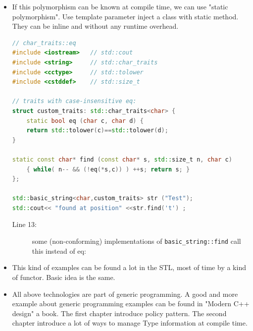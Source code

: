 \documentclass[a4paper,11pt,twoside]{book}
\begin{document}
\begin{itemize}
		\item If this polymorphism can be known at compile time, we can use "static polymorphism". Use template parameter inject a class with static method. They can be inline and without any runtime overhead. 
\begin{lstlisting}[frame=single, language=c++]
// char_traits::eq
#include <iostream>   // std::cout
#include <string>     // std::char_traits
#include <cctype>     // std::tolower
#include <cstddef>    // std::size_t
	
// traits with case-insensitive eq:
struct custom_traits: std::char_traits<char> {
	static bool eq (char c, char d) { 
	return std::tolower(c)==std::tolower(d); 
}
	
static const char* find (const char* s, std::size_t n, char c)
	{ while( n-- && (!eq(*s,c)) ) ++s; return s; }
};
	
std::basic_string<char,custom_traits> str ("Test");
std::cout<< "found at position" <<str.find('t') ;
\end{lstlisting}
\begin{description}
	\item[Line 13:] some (non-conforming) implementations of \texttt{basic\_string::find} call this instead of eq:
\end{description}

	
	\item This kind of examples can be found a lot in the STL, most of time by a kind of functor. Basic idea is the same.
	
	\item All above technologies are part of generic programming. A good and more example about generic programming examples can be found in "Modern C++ design" a book. The first chapter introduce policy pattern. The second chapter introduce a lot of ways to manage Type information at compile time. 
	
\end{itemize}
\end{document}
